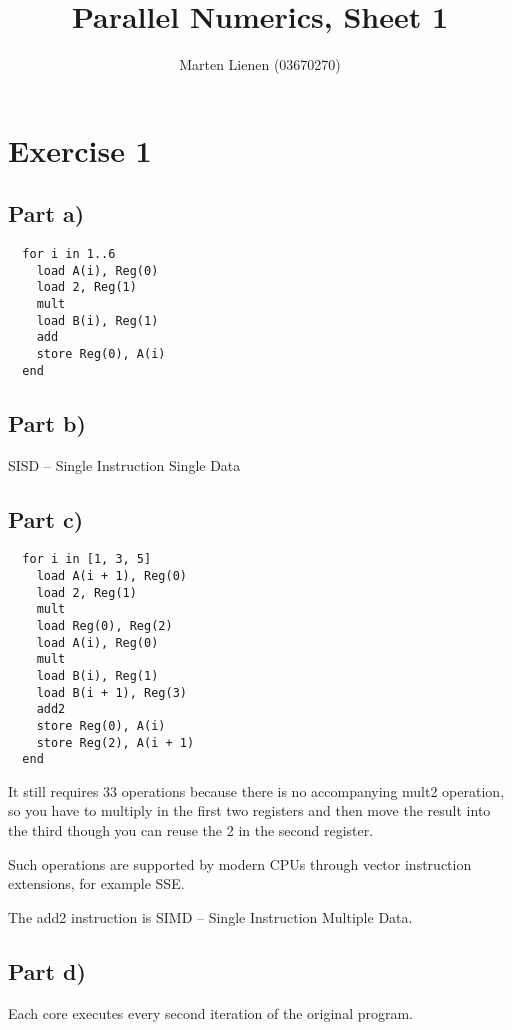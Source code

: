 \documentclass[10pt,a4paper]{article}
\title{Parallel Numerics, Sheet 1}
\author{Marten Lienen (03670270)}
\begin{document}
\maketitle

\section*{Exercise 1}

\subsection*{Part a)}

\begin{verbatim}
  for i in 1..6
    load A(i), Reg(0)
    load 2, Reg(1)
    mult
    load B(i), Reg(1)
    add
    store Reg(0), A(i)
  end
\end{verbatim}

\subsection*{Part b)}

SISD -- Single Instruction Single Data

\subsection*{Part c)}

\begin{verbatim}
  for i in [1, 3, 5]
    load A(i + 1), Reg(0)
    load 2, Reg(1)
    mult
    load Reg(0), Reg(2)
    load A(i), Reg(0)
    mult
    load B(i), Reg(1)
    load B(i + 1), Reg(3)
    add2
    store Reg(0), A(i)
    store Reg(2), A(i + 1)
  end
\end{verbatim}

It still requires 33 operations because there is no accompanying mult2 operation, so you have to multiply in the first two registers and then move the result into the third though you can reuse the 2 in the second register.

Such operations are supported by modern CPUs through vector instruction extensions, for example SSE.

The add2 instruction is SIMD -- Single Instruction Multiple Data.

\subsection*{Part d)}

Each core executes every second iteration of the original program.
\end{document}
